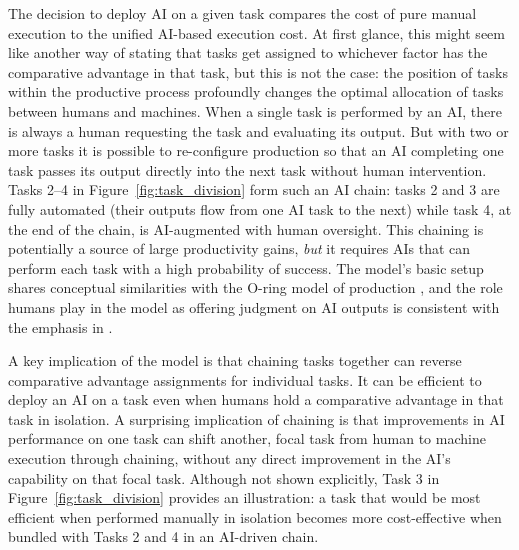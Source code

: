 \documentclass{article}
\theoremstyle{plain}
\theoremstyle{plain}
\begin{document}
The decision to deploy AI on a given task compares the cost of pure manual execution to the unified AI-based execution cost.  
At first glance, this might seem like another way of stating that tasks get assigned to whichever factor has the comparative advantage in that task, but this is not the case: the position of tasks within the productive process profoundly changes the optimal allocation of tasks between humans and machines.
When a single task is performed by an AI, there is always a human requesting the task and evaluating its output.  
But with two or more tasks it is possible to re-configure production so that an AI completing one task passes its output directly into the next task without human intervention.  
Tasks 2--4 in Figure~\ref{fig:task_division} form such an AI chain: tasks 2 and 3 are fully automated (their outputs flow from one AI task to the next) while task 4, at the end of the chain, is AI-augmented with human oversight.
This chaining is potentially a source of large productivity gains, \emph{but} it requires AIs that can perform each task with a high probability of success.  
The model’s basic setup shares conceptual similarities with the O-ring model of production \citep{kremer1993}, and the role humans  play in the model as offering judgment on AI outputs is consistent with the emphasis in \cite{agrawal2019exploring}.

A key implication of the model is that chaining tasks together can reverse comparative advantage assignments for individual tasks.
It can be efficient to deploy an AI on a task even when humans hold a comparative advantage in that task in isolation.
A surprising implication of chaining is that improvements in AI performance on one task can shift another, focal task from human to machine execution through chaining, without any direct improvement in the AI’s capability on that focal task.
Although not shown explicitly, Task 3 in Figure~\ref{fig:task_division} provides an illustration: a task that would be most efficient when performed manually in isolation becomes more cost-effective when bundled with Tasks 2 and 4 in an AI-driven chain.
\end{document}

